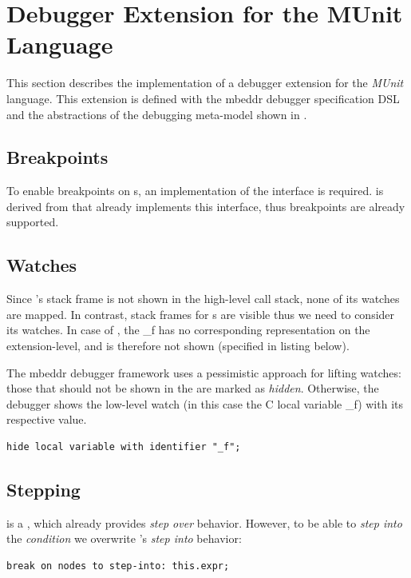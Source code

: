 \section{Debugger Extension for the MUnit Language}

This section describes the implementation of a debugger extension
for the \emph{MUnit} language. This extension is defined with the mbeddr
debugger specification \ac{DSL} and the abstractions of the debugging
meta-model shown in .

\subsection{Breakpoints}  To enable
breakpoints on s, 
an implementation of the  interface is required.
 is derived from  that already implements
this interface, thus breakpoints are already supported.

\subsection{Watches} 

Since 's  stack frame is not shown in the high-level
call stack, none of its watches are mapped.
In contrast,  stack frames for s are visible thus we need
to consider its watches. In case of , the 
 \_f has no corresponding
representation on the extension-level, and 
is therefore not shown (specified in listing below).

The mbeddr debugger framework uses a pessimistic approach for lifting watches:
those that should not be shown in the  are marked as \emph{hidden}.
Otherwise, the debugger shows the low-level watch (in this case the C local
variable \_f) with its respective value.

\begin{lstlisting}[frame=single,language=debuggerDSL]
hide local variable with identifier "_f";
\end{lstlisting}

\subsection{Stepping} 

 is a , which
already provides \emph{step over} behavior. However, to be able to 
\emph{step into} the \emph{condition} we overwrite 's 
\emph{step into} behavior: 
\begin{lstlisting}[language=debuggerDSL,frame=single]
break on nodes to step-into: this.expr;
\end{lstlisting}

